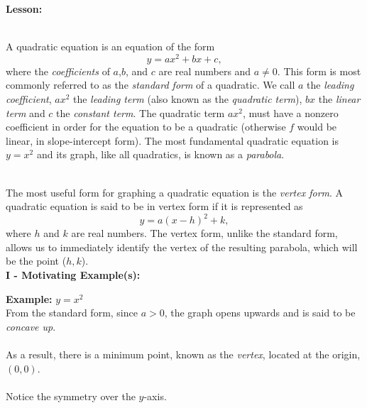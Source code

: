 \documentclass[12pt]{article}
\theoremstyle{definition}
\begin{document}
{\bf Lesson:}\\
\ \par
A quadratic equation is an equation of the form $$y=ax^2+bx+c,$$ where the {\it coefficients} of $a$,$b$, and $c$ are real numbers and $a\neq 0$. This form is most commonly referred to as the {\it standard form} of a quadratic.  We call $a$ the {\it leading coefficient}, $ax^2$ the {\it leading term} (also known as the {\it quadratic term}), $bx$ the {\it linear term} and $c$ the {\it constant term}.  The quadratic term $ax^2$, must have a nonzero coefficient in order for the equation to be a quadratic (otherwise $f$ would be linear, in slope-intercept form). The most fundamental quadratic equation is $y=x^2$ and its graph, like all quadratics, is known as a {\it parabola}.\\
\ \par
The most useful form for graphing a quadratic equation is the \textit{vertex form}.  A quadratic equation is said to be in vertex form if it is represented as $$y=a(x-h)^2+k,$$ where $h$ and $k$ are real numbers.  The vertex form, unlike the standard form, allows us to immediately identify the vertex of the resulting parabola, which will be the point ($h,k$).\\
\newpage
{\bf I - Motivating Example(s):}
\begin{multicols}{2}
{\bf Example:} $y=x^2$\\

From the standard form, since $a>0$, the graph opens upwards and is said to be {\it concave up}.\\ \\
 As a result, there is a minimum point, known as the {\it vertex}, located at the origin, $(0,0)$. \\  \\
Notice the symmetry over the $y$-axis.

\columnbreak

\begin{center}
\end{center}
\end{multicols}
\end{document}
